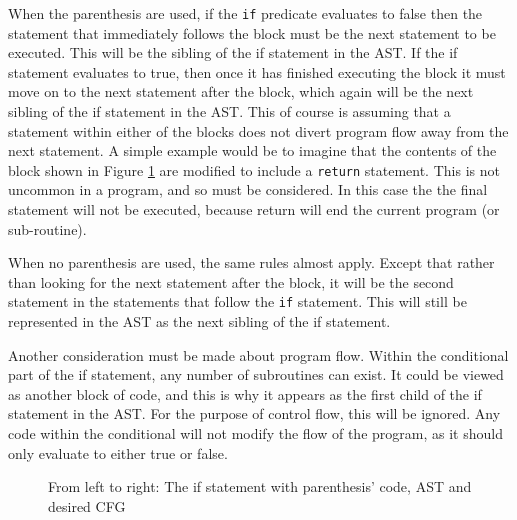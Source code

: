 When the parenthesis are used, if the \verb|if| predicate evaluates to false then the statement that immediately follows the block must be the next statement to be executed. This will be the sibling of the if statement in the AST. If the if statement evaluates to true, then once it has finished executing the block it must move on to the next statement after the block, which again will be the next sibling of the if statement in the AST. This of course is assuming that a statement within either of the blocks does not divert program flow away from the next statement. A simple example would be to imagine that the contents of the block shown in Figure \ref{fig:if} are modified to include a \verb|return| statement. This is not uncommon in a program, and so must be considered. In this case the the final statement will not be executed, because return will end the current program (or sub-routine).

When no parenthesis are used, the same rules almost apply. Except that rather than looking for the next statement after the block, it will be the second statement in the statements that follow the \verb|if| statement. This will still be represented in the AST as the next sibling of the if statement.

Another consideration must be made about program flow. Within the conditional part of the if statement, any number of subroutines can exist. It could be viewed as another block of code, and this is why it appears as the first child of the if statement in the AST. For the purpose of control flow, this will be ignored. Any code within the conditional will not modify the flow of the program, as it should only evaluate to either true or false.

\begin{figure}
\centering
\begin{minipage}{.3\textwidth}
  \centering
  
\end{minipage}%
\begin{minipage}{.3\textwidth}
  \centering
\end{minipage}
\begin{minipage}{.3\textwidth}
  \centering
\end{minipage}
\caption{From left to right: The if statement with parenthesis' code, AST and desired CFG}
\label{fig:if}
\end{figure}

